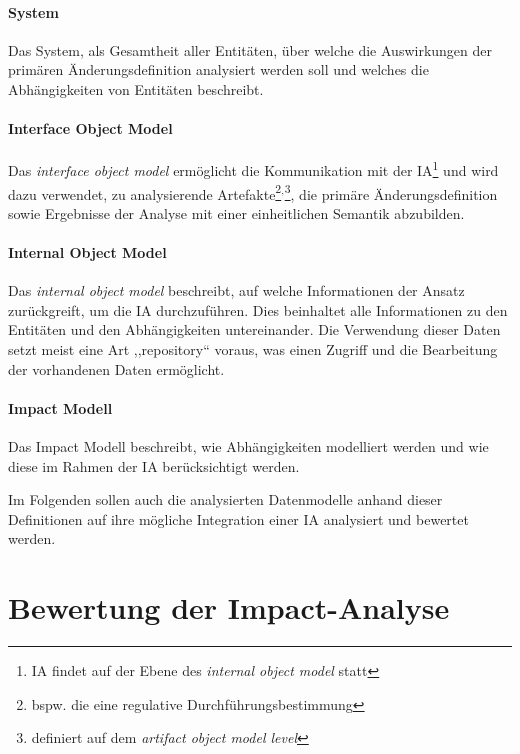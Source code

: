     \paragraph{System}
        Das System, als Gesamtheit aller Entitäten, über welche die Auswirkungen der primären Änderungsdefinition analysiert werden soll und welches die Abhängigkeiten von Entitäten beschreibt.
    
    \paragraph{Interface Object Model}
        Das \textit{interface object model} ermöglicht die Kommunikation mit der \ac{IA}\footnote{\ac{IA} findet auf der Ebene des \textit{internal object model} statt} und wird dazu verwendet, zu analysierende Artefakte\footnote{bspw. die eine regulative Durchführungsbestimmung}$^,$\footnote{definiert auf dem \textit{artifact object model level}}, die primäre Änderungsdefinition sowie Ergebnisse der Analyse mit einer einheitlichen Semantik abzubilden.  
    
    \paragraph{Internal Object Model}
        Das \textit{internal object model} beschreibt, auf welche Informationen der Ansatz zurückgreift, um die \ac{IA} durchzuführen.
        Dies beinhaltet alle Informationen zu den Entitäten und den Abhängigkeiten untereinander.
        Die Verwendung dieser Daten setzt meist eine Art ,,repository`` voraus, was einen Zugriff und die Bearbeitung der vorhandenen Daten ermöglicht. \cite[295]{app_bohner}
    
    \paragraph{Impact Modell}
        Das Impact Modell beschreibt, wie Abhängigkeiten modelliert werden und wie diese im Rahmen der \ac{IA} berücksichtigt werden.
    
    \bigskip
    \noindent
    Im Folgenden sollen auch die analysierten Datenmodelle anhand dieser Definitionen auf ihre mögliche Integration einer \ac{IA} analysiert und bewertet werden.
    
\pagebreak
\section{Bewertung der Impact-Analyse}
\label{model_ia_bew}
    
